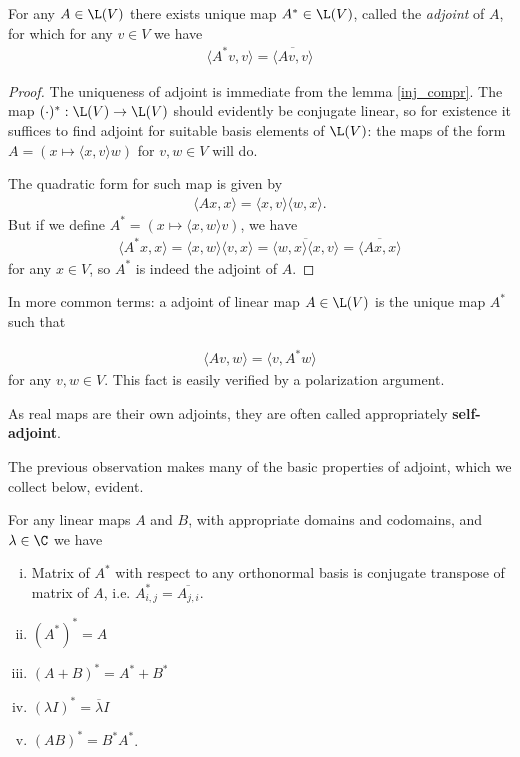 \begin{lause}
	For any $A \in \L(V)$ there exists unique map $A^{*} \in \L(V)$, called the \textit{adjoint} of $A$, for which for any $v \in V$ we have
	\begin{align*}
	\langle A^{*} v, v\rangle = \overline{\langle A v, v \rangle}
	\end{align*}
\end{lause}
\begin{proof}
	The uniqueness of adjoint is immediate from the lemma \ref{inj_compr}. The map $(\cdot)^{*} : \L(V) \to \L(V)$ should evidently be conjugate linear, so for existence it suffices to find adjoint for suitable basis elements of $\L(V)$: the maps of the form $A = (x \mapsto \langle x, v \rangle w)$ for $v, w \in V$ will do.

	The quadratic form for such map is given by
	\begin{align*}
		\langle A x, x \rangle = \langle x, v \rangle \langle w, x \rangle.
	\end{align*}
	But if we define $A^{*} = (x \mapsto \langle x, w \rangle v)$, we have
	\begin{align*}
		\langle A^{*} x, x \rangle = \langle x, w \rangle \langle v, x \rangle = \overline{\langle w, x \rangle \langle x, v \rangle} = \overline{\langle A x, x \rangle}
	\end{align*}
	for any $x \in V$, so $A^{*}$ is indeed the adjoint of $A$.
\end{proof}

In more common terms: a adjoint of linear map $A \in \L(V)$ is the unique map $A^{*}$ such that

\begin{align}\label{adjoint_common}
	\langle A v, w \rangle = \langle v, A^{*} w \rangle
\end{align}
for any $v, w \in V$. This fact is easily verified by a polarization argument.

As real maps are their own adjoints, they are often called appropriately \textbf{self-adjoint}.

The previous observation makes many of the basic properties of adjoint, which we collect below, evident.

\begin{lause}\label{basic_adjoint}
	For any linear maps $A$ and $B$, with appropriate domains and codomains, and $\lambda \in \C$ we have
	\begin{enumerate}[i)]
		\item Matrix of $A^{*}$ with respect to any orthonormal basis is conjugate transpose of matrix of $A$, i.e. $A^{*}_{i, j} = \overline{A_{j, i}}$.
		\item $(A^{*})^{*} = A$
		\item $(A + B)^{*} = A^{*} + B^{*}$
		\item $(\lambda I)^{*} = \overline{\lambda} I$
		\item $(AB)^{*} = B^{*}A^{*}$.
	\end{enumerate}
\end{lause}

